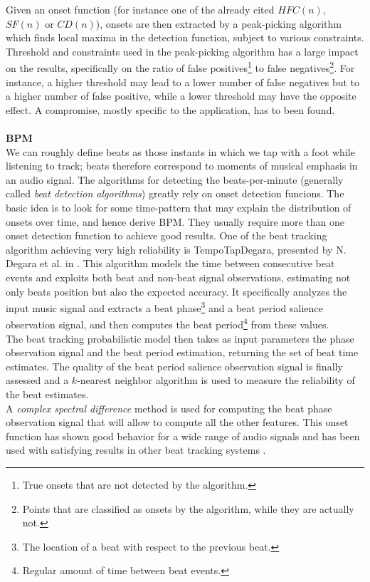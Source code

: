 Given an onset function (for instance one of the already cited $HFC(n)$, $SF(n)$ or $CD(n)$), onsets are then extracted by a peak-picking algorithm which finds local maxima in the detection function, subject to various constraints. Threshold and constraints used in the peak-picking algorithm has a large impact on the results, specifically on the ratio of false positives\footnote{True onsets that are not detected by the algorithm.} to false negatives\footnote{Points that are classified as onsets by the algorithm, while they are actually not.}. For instance, a higher threshold may lead to a lower number of false negatives but to a higher number of false positive, while a lower threshold may have the opposite effect. A compromise, mostly specific to the application, has to been found.
\\ \\ 
\textbf{BPM} \\ 
We can roughly define beats as those instants in which we tap with a foot while listening to track; beats therefore correspond to moments of musical emphasis in an audio signal. The algorithms for detecting the beats-per-minute (generally called \textit{beat detection algorithms}) greatly rely on onset detection funcions. The basic idea is to look for some time-pattern that may explain the distribution of onsets over time, and hence derive BPM. They usually require more than one onset detection function to achieve good results. One of the beat tracking algorithm achieving very high reliability is TempoTapDegara, presented by N. Degara et al. in \cite{degara12}. This algorithm models the time between consecutive beat events and exploits both beat and non-beat signal observations, estimating not only beats position but also the expected accuracy. It specifically analyzes the input music signal and extracts a beat phase\footnote{The location of a beat with respect to the previous beat.} and a beat period salience observation signal, and then computes the beat period\footnote{Regular amount of time between beat events.} from these values.\\ The beat tracking probabilistic model then takes as input parameters the phase observation signal and the beat period estimation, returning the set of beat time estimates. The quality of the beat period salience observation signal is finally assessed and a $k$-nearest neighbor algorithm is used to measure the reliability of the beat estimates. \\
A \textit{complex spectral difference} method is used for computing the beat phase observation signal that will allow to compute all the other features. This onset function has shown good behavior for a wide range of audio signals and has been used with satisfying results in other beat tracking systems \cite{davies07}. 

